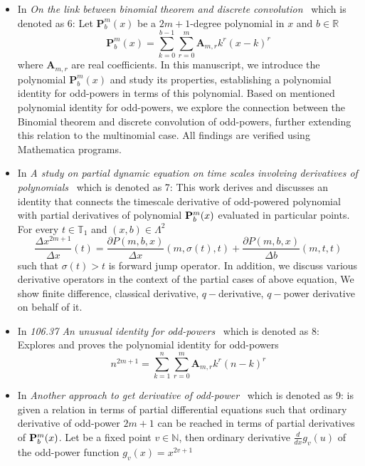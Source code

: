\begin{itemize}
    \item In \textit{On the link between binomial theorem and discrete convolution}~\cite{kolosov2016link}
    which is denoted as 6:
    Let $\mathbf{P}^{m}_{b}(x)$ be a $2m+1$-degree polynomial in $x$ and $b \in \mathbb{R}$
    \[
        \mathbf{P}^{m}_{b}(x) = \sum_{k=0}^{b-1} \sum_{r=0}^{m} \mathbf{A}_{m,r} k^r (x-k)^r
    \]
    where $\mathbf{A}_{m,r}$ are real coefficients.
    In this manuscript, we introduce the polynomial $\mathbf{P}^{m}_{b}(x)$ and study its properties,
    establishing a polynomial identity for odd-powers in terms of this polynomial.
    Based on mentioned polynomial identity for odd-powers,
    we explore the connection between the Binomial theorem and discrete convolution of odd-powers,
    further extending this relation to the multinomial case.
    All findings are verified using Mathematica programs.
    \item In \textit{A study on partial dynamic equation on time scales involving derivatives
    of polynomials}~\cite{kolosov2016study} which is denoted as 7:
    This work derives and discusses an identity that connects the timescale derivative of odd-powered polynomial
    with partial derivatives of polynomial ${\mathbf{P}}\sp{m} \sb{b}(x)$ evaluated in particular points.
    For every $t\in\mathbb{T}_1$ and $(x,b) \in \Lambda^2$
    \[
        \frac{\Delta x^{2m+1}}{\Delta x}(t) =
        \frac{\partial P(m,b,x)}{\Delta x} (m, \sigma(t), t) +
        \frac{\partial P(m,b,x)}{\Delta b} (m, t, t)
    \]
    such that $\sigma(t) > t$ is forward jump operator.
    In addition, we discuss various derivative operators in the context of the partial cases of above equation,
    We show finite difference, classical derivative, $q-$derivative, $q-$power derivative on behalf of it.
    \item In \textit{106.37 An unusual identity for odd-powers}~\cite{kolosov2022106} which is denoted as 8:
    Explores and proves the polynomial identity for odd-powers
    \[
        n^{2m+1} = \sum_{k=1}^{n} \sum_{r=0}^{m} \mathbf{A}_{m,r} k^r (n-k)^r
    \]
    \item In \textit{Another approach to get derivative of odd-power}~\cite{kolosov2023another} which is denoted as 9:
    is given a relation in terms of partial differential equations such that
    ordinary derivative of odd-power $2m+1$ can be reached in terms of partial derivatives of ${\mathbf{P}}\sp{m} \sb{b}(x)$.
    Let be a fixed point $v\in \mathbb{N}$, then ordinary derivative $\frac{d}{dx} g_v (u)$ of the odd-power function $g_v(x) = x^{2v + 1}$

\end{itemize}
